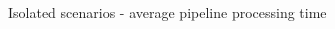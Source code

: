 \begin{figure}[!htb]
\begin{center}
\begin{subfigmatrix}{2}
    \end{subfigmatrix}
    \caption{Isolated scenarios - average pipeline processing time}
    \label{F:isoappt}
  \end{center}
\end{figure}



